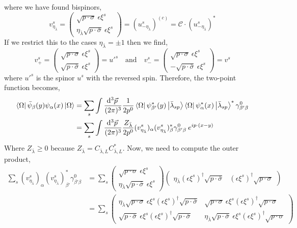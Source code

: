 \documentclass[12pt]{article}
\begin{document}
where we have found bispinors,
\[ v^s_{\eta_{\bar{\lambda}}} = 
\begin{pmatrix}
\sqrt{p \cdot \sigma} \: \epsilon \xi^s \\
\eta_{\bar{\lambda}} \sqrt{p \cdot \bar{\sigma}} \: \epsilon \xi^s
\end{pmatrix} = (u^s_{-\eta_{\bar{\lambda}}})^{(c)} = \mathcal{C} \cdot (u^s_{-\eta_{\bar{\lambda}}})^*  \]
If we restrict this to the cases $\eta_{\bar{\lambda}} = \pm 1$ then we find,
\[ v^s_{+} = 
\begin{pmatrix}
\sqrt{p \cdot \sigma} \: \epsilon \xi^s \\
\sqrt{p \cdot \bar{\sigma}} \: \epsilon \xi^s
\end{pmatrix} 
= u'^s \quad \text{and} \quad
v^s_{-} = 
\begin{pmatrix}
\sqrt{p \cdot \sigma} \: \epsilon \xi^s \\
- \sqrt{p \cdot \bar{\sigma}} \: \epsilon \xi^s
\end{pmatrix}
= v^{s} \]
where $u'^{s}$ is the spinor $u^s$ with the reversed spin. Therefore, the two-point function becomes,
\begin{align*}
\left< \Omega \right| \bar{\psi}_{\beta}(y) \psi_{\alpha}(x) \left| \Omega \right>
& = \sum_{s} \int \frac{\mathrm{d}^{3} \vec{p} \:}{(2 \pi)^3} \frac{1}{2 p^0} \left< \Omega \right| \psi^*_{\beta'}(y) \left| {\bar{\lambda}}_{s p} \right> \left< \Omega \right| \psi^*_{\alpha}(x) \left| {\bar{\lambda}}_{s p} \right>^* \gamma^0_{\beta' \beta}
\\
& = \sum_{s} \int \frac{\mathrm{d}^{3} \vec{p} \:}{(2 \pi)^3} \frac{Z_{\bar{\lambda}}}{2 p^0} (v^s_{\eta_{\bar{\lambda}}})_\alpha (v^s_{\eta_{\bar{\lambda}}})^*_\beta \gamma^0_{\beta' \beta} \: e^{i p \cdot (x - y)}
\end{align*}
Where $Z_{\bar{\lambda}} \ge 0$ because $Z_{\bar{\lambda}} = C_{\bar{\lambda}, L} C_{\bar{\lambda}, L}^*$.
Now, we need to compute the outer product,
\begin{align*} 
\sum_{s} (v^s_{\eta_{\bar{\lambda}}})_{\alpha} (v^s_{\eta_{\bar{\lambda}}})_{\beta'}^* \gamma^0_{\beta' \beta} & = 
\sum_{s} \begin{pmatrix}
\sqrt{p \cdot \sigma} \: \epsilon \xi^s \\
\eta_{\bar{\lambda}} \sqrt{p \cdot \bar{\sigma}} \: \epsilon \xi^s
\end{pmatrix}
\begin{pmatrix}
\eta_{\bar{\lambda}}  (\epsilon \xi^s)^\dagger \sqrt{p \cdot \bar{\sigma}}  &  (\epsilon \xi^s)^\dagger \sqrt{p \cdot \sigma}
\end{pmatrix}
\\
& = \sum_{s}
\begin{pmatrix}
\eta_{\bar{\lambda}} \sqrt{p \cdot \sigma} \: \epsilon \xi^s (\epsilon \xi^s)^\dagger \sqrt{p \cdot \bar{\sigma}} & \sqrt{p \cdot \sigma} \: \epsilon \xi^s (\epsilon \xi^s)^\dagger \sqrt{p \cdot \sigma} 
\\
\sqrt{p \cdot \bar{\sigma}} \: \epsilon \xi^s (\epsilon \xi^s)^\dagger \sqrt{p \cdot \bar{\sigma}} & \eta_{\bar{\lambda}} \sqrt{p \cdot \bar{\sigma}} \: \epsilon \xi^s (\epsilon \xi^s)^\dagger \sqrt{p \cdot \sigma} 
\end{pmatrix}
\end{align*}
\end{document}
